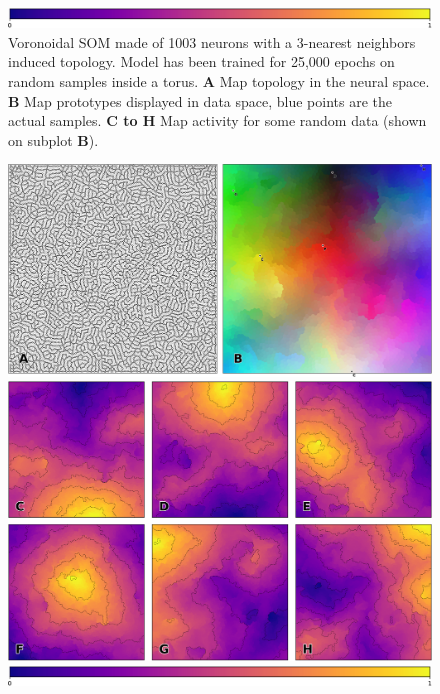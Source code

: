 \begin{figure}
  \vspace{2mm}

  \includegraphics[width=\columnwidth]{figures/colormap.pdf}
  \caption{Voronoidal SOM made of 1003 neurons with a 3-nearest neighbors
    induced topology. Model has been trained for 25,000 epochs on random
    samples inside a torus. \textbf{A} Map topology in the neural
    space. \textbf{B} Map prototypes displayed in data space, blue points are
    the actual samples. \textbf{C to H} Map activity for some random data
    (shown on subplot \textbf{B}).}
\end{figure}

\begin{figure}
  \includegraphics[width=\columnwidth]{figures/vsom-colors-1.pdf}

  \vspace{2mm}
  
  \includegraphics[width=\columnwidth]{figures/vsom-colors-2.pdf}

  \vspace{2mm}

  \includegraphics[width=\columnwidth]{figures/colormap.pdf}

  \caption{}
\end{figure}


